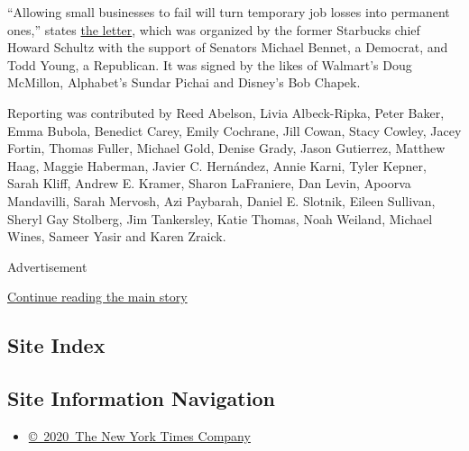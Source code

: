 ``Allowing small businesses to fail will turn temporary job losses into
permanent ones,'' states
\href{https://www.howardschultz.com/lettertocongress/}{the letter},
which was organized by the former Starbucks chief Howard Schultz with
the support of Senators Michael Bennet, a Democrat, and Todd Young, a
Republican. It was signed by the likes of Walmart's Doug McMillon,
Alphabet's Sundar Pichai and Disney's Bob Chapek.

Reporting was contributed by Reed Abelson, Livia Albeck-Ripka, Peter
Baker, Emma Bubola, Benedict Carey, Emily Cochrane, Jill Cowan, Stacy
Cowley, Jacey Fortin, Thomas Fuller, Michael Gold, Denise Grady, Jason
Gutierrez, Matthew Haag, Maggie Haberman, Javier C. Hernández, Annie
Karni, Tyler Kepner, Sarah Kliff, Andrew E. Kramer, Sharon LaFraniere,
Dan Levin, Apoorva Mandavilli, Sarah Mervosh, Azi Paybarah, Daniel E.
Slotnik, Eileen Sullivan, Sheryl Gay Stolberg, Jim Tankersley, Katie
Thomas, Noah Weiland, Michael Wines, Sameer Yasir and Karen Zraick.

Advertisement

\protect\hyperlink{after-bottom}{Continue reading the main story}

\hypertarget{site-index}{%
\subsection{Site Index}\label{site-index}}

\hypertarget{site-information-navigation}{%
\subsection{Site Information
Navigation}\label{site-information-navigation}}

\begin{itemize}
\tightlist
\item
  \href{https://help.nytimes.com/hc/en-us/articles/115014792127-Copyright-notice}{©~2020~The
  New York Times Company}
\end{itemize}

